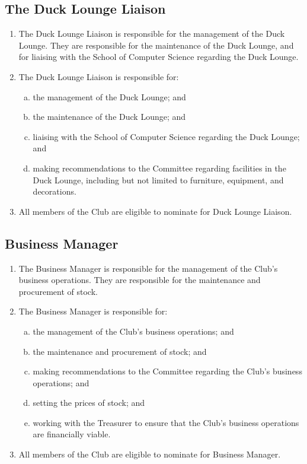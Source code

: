 \documentclass{schedule}
\begin{document}
\subsection{The Duck Lounge Liaison}
\begin{enumerate}[(1)]
    \item The Duck Lounge Liaison is responsible for the management of the Duck Lounge. They are responsible for the maintenance of the Duck Lounge, and for liaising with the School of Computer Science regarding the Duck Lounge.
    \item The Duck Lounge Liaison is responsible for:
          \begin{enumerate}[(a)]
              \item the management of the Duck Lounge; and
              \item the maintenance of the Duck Lounge; and
              \item liaising with the School of Computer Science regarding the Duck Lounge; and
              \item making recommendations to the Committee regarding facilities in the Duck Lounge, including but not limited to furniture, equipment, and decorations.
          \end{enumerate}
    \item All members of the Club are eligible to nominate for Duck Lounge Liaison.
\end{enumerate}

\subsection{Business Manager}
\begin{enumerate}[(1)]
    \item The Business Manager is responsible for the management of the Club's business operations. They are responsible for the maintenance and procurement of stock.
    \item The Business Manager is responsible for:
          \begin{enumerate}[(a)]
              \item the management of the Club's business operations; and
              \item the maintenance and procurement of stock; and
              \item making recommendations to the Committee regarding the Club's business operations; and
              \item setting the prices of stock; and
              \item working with the Treasurer to ensure that the Club's business operations are financially viable.
          \end{enumerate}
    \item All members of the Club are eligible to nominate for Business Manager.
\end{enumerate}
\end{document}
